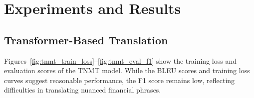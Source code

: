 \documentclass[12pt]{article}
\begin{document}
\section{Experiments and Results}
\label{sec:results}

\subsection{Transformer-Based Translation}
Figures~\ref{fig:tnmt_train_loss}--\ref{fig:tnmt_eval_f1} show the training loss and evaluation scores of the TNMT model. While the BLEU scores and training loss curves suggest reasonable performance, the F1 score remains low, reflecting difficulties in translating nuanced financial phrases.
\end{document}
